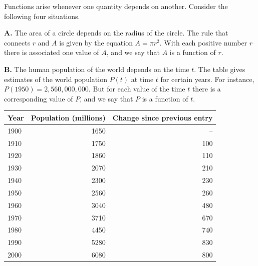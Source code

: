 \documentclass[boxednum]{chapterstart}
\begin{document}


Functions arise whenever one quantity depends on another. Consider the
following four situations.

\textbf{A.} The area of a circle depends on the radius of the circle. The
rule that connects $r$ and $A$ is given by the equation $A = \pi r^2$. With
each positive number $r$ there is associated one value of $A$, and we say
that $A$ is a function of $r$.

\textbf{B.} The human population of the world depends on the time $t$. The
table gives estimates of the world population $P(t)$ at time $t$ for certain
years. For instance, $P(1950) = 2{,}560{,}000{,}000$. But for each value of
the time $t$ there is a corresponding value of $P$, and we say that $P$ is a
function of $t$.

\begin{widetable}[1.0in]
  \caption{World population estimates, 1900--2000.}
  \label{tab:population}
  \begin{tabular*}{\linewidth}{@{\extracolsep{\fill}}lrr}
    \toprule
    Year & Population (millions) & Change since previous entry \\
    \midrule
    1900 & 1650 & --   \\
    1910 & 1750 & 100  \\
    1920 & 1860 & 110  \\
    1930 & 2070 & 210  \\
    1940 & 2300 & 230  \\
    1950 & 2560 & 260  \\
    1960 & 3040 & 480  \\
    1970 & 3710 & 670  \\
    1980 & 4450 & 740  \\
    1990 & 5280 & 830  \\
    2000 & 6080 & 800  \\
    \bottomrule
  \end{tabular*}
\end{widetable}
\end{document}

